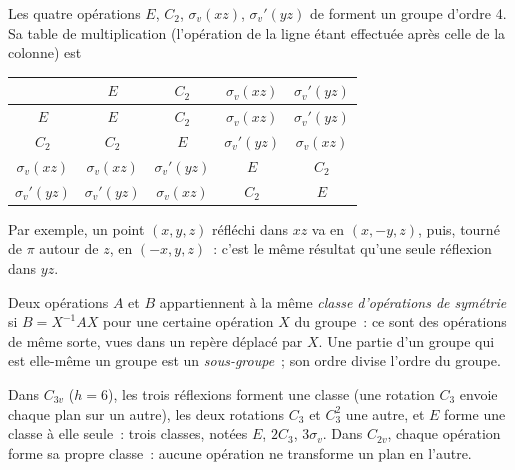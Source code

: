\begin{example}\label{ex:b3:point-groups:c2v}
Les quatre opérations $E$, $C_2$, $\sigma_v(xz)$, $\sigma_v'(yz)$ de
 forment un groupe d'ordre 4. Sa table de multiplication
(l'opération de la ligne étant effectuée après celle de la colonne) est
\begin{center}\small
\begin{tabular}{c|cccc}
\hline
 & $E$ & $C_2$ & $\sigma_v(xz)$ & $\sigma_v'(yz)$\\ \hline
$E$ & $E$ & $C_2$ & $\sigma_v(xz)$ & $\sigma_v'(yz)$\\
$C_2$ & $C_2$ & $E$ & $\sigma_v'(yz)$ & $\sigma_v(xz)$\\
$\sigma_v(xz)$ & $\sigma_v(xz)$ & $\sigma_v'(yz)$ & $E$ & $C_2$\\
$\sigma_v'(yz)$ & $\sigma_v'(yz)$ & $\sigma_v(xz)$ & $C_2$ & $E$\\ \hline
\end{tabular}
\end{center}
Par exemple, un point $(x, y, z)$ réfléchi dans $xz$ va en $(x, -y, z)$,
puis, tourné de $\pi$ autour de $z$, en $(-x, y, z)$~: c'est le même
résultat qu'une seule réflexion dans
$yz$.
\end{example}

\begin{definition}\label{def:b3:point-groups:class}
Deux opérations $A$ et $B$ appartiennent à la même \emph{classe
d'opérations de symétrie} si $B = X^{-1}AX$ pour une
certaine opération $X$ du groupe~: ce sont des opérations de même sorte,
vues dans un repère déplacé par $X$. Une partie d'un groupe qui est
elle-même un groupe est un
\emph{sous-groupe}~; son ordre divise l'ordre du groupe.
\end{definition}

\begin{example}[Classes de \ce{NH3}]\label{ex:b3:point-groups:classes}
Dans $C_{3v}$ ($h = 6$), les trois réflexions forment une classe (une
rotation $C_3$ envoie chaque plan sur un autre), les deux rotations
$C_3$ et $C_3^2$ une autre,
et $E$ forme une classe à elle seule~: trois classes, notées $E$, $2C_3$,
$3\sigma_v$. Dans
$C_{2v}$, chaque opération forme sa propre classe~: aucune opération ne
transforme un plan en l'autre.
\end{example}

